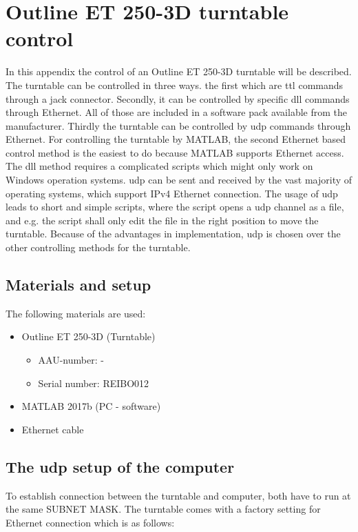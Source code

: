 \chapter{Outline ET 250-3D turntable control}\label{appendix:turntable}
In this appendix the control of an Outline ET 250-3D turntable will be described. The turntable can be controlled in three ways. the first which are  \gls{ttl} commands through a jack connector. Secondly, it  can be controlled by specific \gls{dll} commands through Ethernet. All of those are included in a software pack available from the manufacturer. Thirdly the turntable can be controlled by \gls{udp} commands through Ethernet. For controlling the turntable by MATLAB, the second Ethernet based control method is the easiest to do because MATLAB supports Ethernet access. The \gls{dll} method requires a complicated scripts which might only work on Windows operation systems. \gls{udp} can be sent and received by the vast majority of  operating systems, which support IPv4 Ethernet connection. The usage of \gls{udp} leads to short and simple scripts, where the script opens a \gls{udp} channel as a file, and e.g. the script shall only edit the file in the right position to move the turntable. Because of the advantages in implementation, \gls{udp} is chosen over the other controlling methods for the turntable.

\section*{Materials and setup}
The following materials are used:
\begin{itemize}
\item Outline ET 250-3D (Turntable)
\begin{itemize}[noitemsep]
\item AAU-number: -
\item Serial number: REIBO012
\end{itemize}
\item MATLAB 2017b (PC - software)
\item Ethernet cable
\end{itemize}



\section*{The \gls{udp} setup of the computer}
To establish connection between the turntable and computer, both have to run at the same SUBNET MASK. The turntable comes with a factory setting for Ethernet connection which is as follows:

